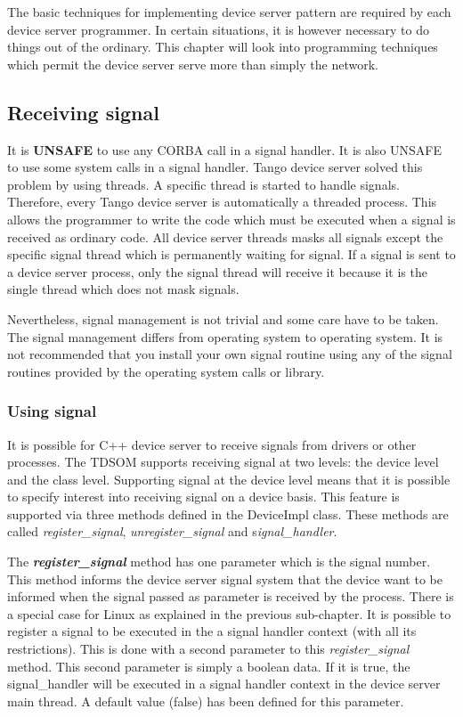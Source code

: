 The basic techniques for implementing device server pattern are required
by each device server programmer. In certain situations, it is however
necessary to do things out of the ordinary. This chapter will look
into programming techniques which permit the device server serve more
than simply the network.


\subsection{Receiving signal}

It is \textbf{UNSAFE} to use any CORBA call in a signal handler. It
is also UNSAFE to use some system calls in a signal handler. Tango
device server solved this problem by using threads.
A specific thread is started to handle signals. Therefore,
every Tango device server is automatically a threaded process. This
allows the programmer to write the code which must be executed when
a signal is received as ordinary code. All device server threads masks
all signals except the specific signal thread which is permanently
waiting for signal. If a signal is sent to a device server process,
only the signal thread will receive it because it is the single thread
which does not mask signals.

Nevertheless, signal management is not trivial and some care have
to be taken. The signal management differs from operating system to
operating system. It is not recommended that you install your own
signal routine using any of the signal routines provided by the operating
system calls or library. 


\subsubsection{Using signal}

It is possible for C++ device server to receive signals from drivers
or other processes. The TDSOM supports receiving signal at two levels:
the device level and the class level. Supporting signal at the device
level means that it is possible to specify interest into receiving
signal on a device basis. This feature is supported via three methods
defined in the DeviceImpl class. These methods
are called \emph{register\_signal}, \emph{unregister\_signal} and
s\emph{ignal\_handler}.

The \textbf{\emph{register\_signal}} method
has one parameter which is the signal number. This method informs
the device server signal system that the device want to be informed
when the signal passed as parameter is received by the process. There
is a special case for Linux as explained in the previous sub-chapter.
It is possible to register a signal to be executed in the a signal
handler context (with all its restrictions). This is done with a second
parameter to this \emph{register\_signal} method. This second parameter
is simply a boolean data. If it is true, the signal\_handler will
be executed in a signal handler context in the device server main
thread. A default value (false) has been defined for this parameter.


